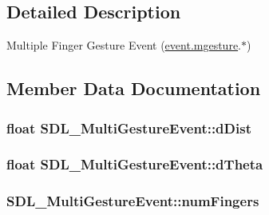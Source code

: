 \subsection{Detailed Description}
Multiple Finger Gesture Event (\hyperlink{union_s_d_l___event_ac19b3c6a6b5181a51eb4fbe2cbe726a9}{event.\+mgesture}.$\ast$) 

\subsection{Member Data Documentation}
\subsubsection[{\texorpdfstring{d\+Dist}{dDist}}]{\setlength{\rightskip}{0pt plus 5cm}float S\+D\+L\+\_\+\+Multi\+Gesture\+Event\+::d\+Dist}\hypertarget{struct_s_d_l___multi_gesture_event_a351c29785c5ce3f68c4591a427265f14}{}\label{struct_s_d_l___multi_gesture_event_a351c29785c5ce3f68c4591a427265f14}
\subsubsection[{\texorpdfstring{d\+Theta}{dTheta}}]{\setlength{\rightskip}{0pt plus 5cm}float S\+D\+L\+\_\+\+Multi\+Gesture\+Event\+::d\+Theta}\hypertarget{struct_s_d_l___multi_gesture_event_a4f4a920dcf5205baa24a140df56f3153}{}\label{struct_s_d_l___multi_gesture_event_a4f4a920dcf5205baa24a140df56f3153}
\subsubsection[{\texorpdfstring{num\+Fingers}{numFingers}}]{ S\+D\+L\+\_\+\+Multi\+Gesture\+Event\+::num\+Fingers}\hypertarget{struct_s_d_l___multi_gesture_event_a6b06cf80372ce3cad40110fdb6ef0353}{}\label{struct_s_d_l___multi_gesture_event_a6b06cf80372ce3cad40110fdb6ef0353}
